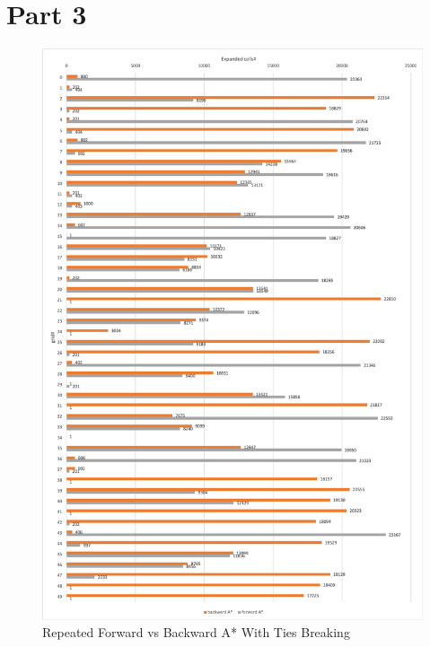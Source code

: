 \documentclass{article}
\begin{document}
\newpage 
\section*{Part 3}

\begin{figure}
\centering
\includegraphics[scale=0.47]{part3.1}
\caption{Repeated Forward vs Backward A* With Ties Breaking}
\label{part3.1}
\end{figure}
\end{document}
